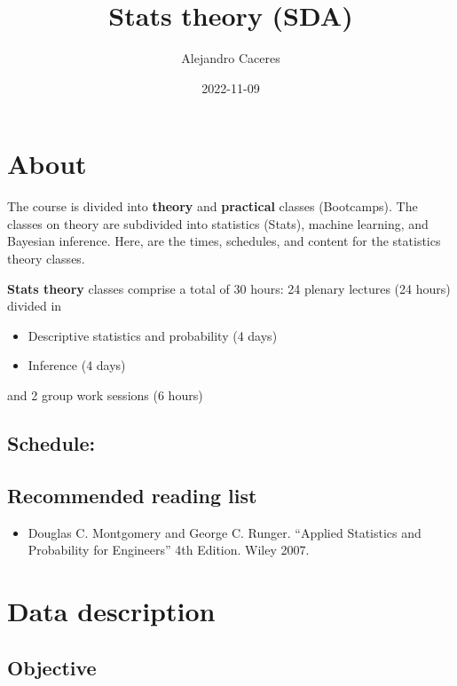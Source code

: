 \documentclass[
]{book}
\title{Stats theory (SDA)}
\author{Alejandro Caceres}
\date{2022-11-09}
\providecommand{\tightlist}{%
  \setlength{\itemsep}{0pt}\setlength{\parskip}{0pt}}
\begin{document}
\maketitle

{
\setcounter{tocdepth}{1}
\tableofcontents
}
\hypertarget{about}{%
\chapter{About}\label{about}}

The course is divided into \textbf{theory} and \textbf{practical} classes (Bootcamps). The classes on theory are subdivided into statistics (Stats), machine learning, and Bayesian inference. Here, are the times, schedules, and content for the statistics theory classes.

\textbf{Stats theory} classes comprise a total of 30 hours: 24 plenary lectures (24 hours) divided in

\begin{itemize}
\tightlist
\item
  Descriptive statistics and probability (4 days)
\item
  Inference (4 days)
\end{itemize}

and 2 group work sessions (6 hours)

\hypertarget{schedule}{%
\section{Schedule:}\label{schedule}}

\hypertarget{recommended-reading-list}{%
\section{Recommended reading list}\label{recommended-reading-list}}

\begin{itemize}
\tightlist
\item
  Douglas C. Montgomery and George C. Runger. ``Applied Statistics and Probability for Engineers'' 4th Edition. Wiley 2007.
\end{itemize}

\hypertarget{data-description}{%
\chapter{Data description}\label{data-description}}

\hypertarget{objective}{%
\section{Objective}\label{objective}}
\end{document}
